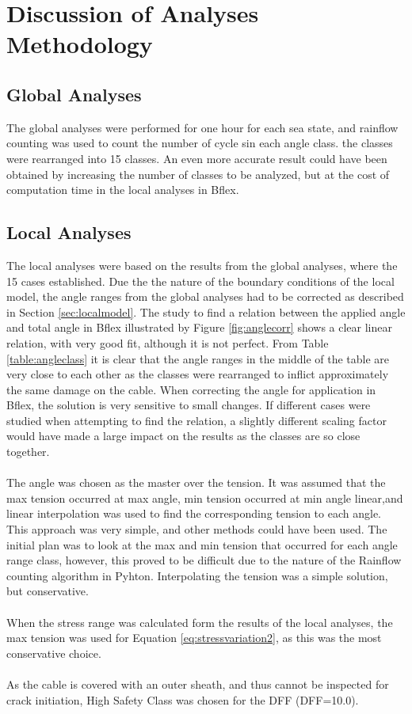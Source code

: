 \section{Discussion of Analyses Methodology}
\subsection{Global Analyses}
The global analyses were performed for one hour for each sea state, and rainflow counting was used to count the number of cycle sin each angle class. the classes were rearranged into 15 classes. An even more accurate result could have been obtained by increasing the number of classes to be analyzed, but at the cost of computation time in the local analyses in Bflex. 

 
\subsection{Local Analyses}
The local analyses were based on the results from the global analyses, where the 15 cases established. Due the the nature of the boundary conditions of the local model, the angle ranges from the global analyses had to be corrected as described in Section \ref{sec:localmodel}. The study to find a relation between the applied angle and total angle in Bflex illustrated by Figure \ref{fig:anglecorr} shows a clear linear relation, with very good fit, although it is not perfect. From Table \ref{table:angleclass} it is clear that the angle ranges in the middle of the table are very close to each other as the classes were rearranged to inflict approximately the same damage on the cable. When correcting the angle for application in Bflex, the solution is very sensitive to small changes. If different cases were studied when attempting to find the relation, a slightly different scaling factor would have made a large impact on the results as the classes are so close together.\\\\
The angle was chosen as the master over the tension. It was assumed that the max tension occurred at max angle, min tension occurred at min angle linear,and linear interpolation was used to find the corresponding tension to each angle. This approach was very simple, and other methods could have been used. The initial plan was to look at the max and min tension that occurred for each angle range class, however, this proved to be difficult due to the nature of the Rainflow counting algorithm in Pyhton. Interpolating the tension was a simple solution, but conservative.\\\\
When the stress range was calculated form the results of the local analyses, the max tension was used for Equation \ref{eq:stressvariation2}, as this was the most conservative choice.\\\\ As the cable is covered with an outer sheath, and thus cannot be inspected for crack initiation, High Safety Class was chosen for the DFF (DFF=10.0). 
